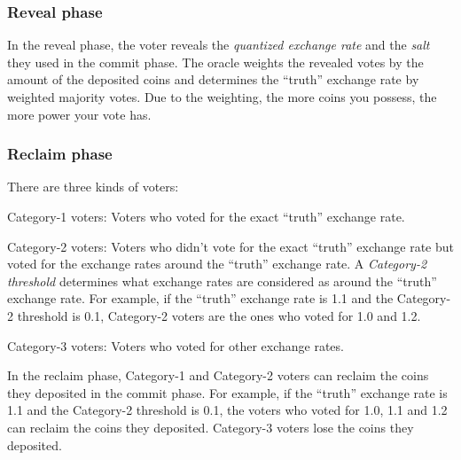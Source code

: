 \documentclass[dvipdfmx,a4paper]{article}
\begin{document}
\subsubsection{Reveal phase}

In the reveal phase, the voter reveals the \textit{quantized exchange rate} and the \textit{salt} they used in the commit phase. The oracle weights the revealed votes by the amount of the deposited coins and determines the ``truth'' exchange rate by weighted majority votes. Due to the weighting, the more coins you possess, the more power your vote has.

\subsubsection{Reclaim phase}

There are three kinds of voters:

\begin{description}
\item{Category-1 voters}: Voters who voted for the exact ``truth'' exchange rate.
\item{Category-2 voters}: Voters who didn't vote for the exact ``truth'' exchange rate but voted for the exchange rates around the ``truth'' exchange rate. A \textit{Category-2 threshold} determines what exchange rates are considered as around the ``truth'' exchange rate. For example, if the ``truth'' exchange rate is 1.1 and the Category-2 threshold is 0.1, Category-2 voters are the ones who voted for 1.0 and 1.2.
\item{Category-3 voters}: Voters who voted for other exchange rates.
\end{description}

In the reclaim phase, Category-1 and Category-2 voters can reclaim the coins they deposited in the commit phase. For example, if the ``truth'' exchange rate is 1.1 and the Category-2 threshold is 0.1, the voters who voted for 1.0, 1.1 and 1.2 can reclaim the coins they deposited. Category-3 voters lose the coins they deposited.
\end{document}
